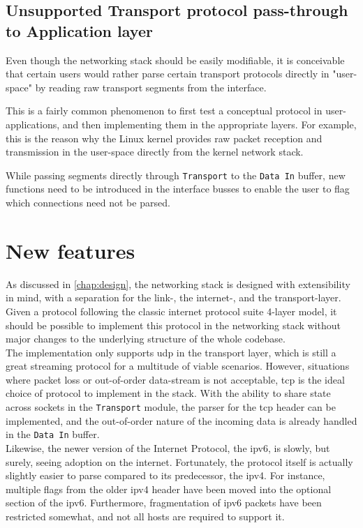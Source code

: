 \subsection{Unsupported Transport protocol pass-through to Application layer}
Even though the networking stack should be easily modifiable, it is conceivable
that certain users would rather parse certain transport protocols directly in
"user-space" by reading raw transport segments from the interface.

This is a fairly common phenomenon to first test a conceptual protocol in
user-applications, and then implementing them in the appropriate layers. For
example, this is the reason why the Linux kernel provides raw packet reception
and transmission in the user-space directly from the kernel network
stack\cite[Version~Linux 5.3-rc6, \texttt{Documentation/networking/tuntap.txt}]{linux}.

While passing segments directly through \texttt{Transport} to the \texttt{Data
In} buffer, new functions need to be introduced in the interface busses to
enable the user to flag which connections need not be parsed.



\section{New features}
As discussed in \autoref{chap:design}, the networking stack is designed
with extensibility in mind, with a separation for the link-, the internet-, and
the transport-layer. Given a protocol following the classic internet protocol
suite 4-layer model, it should be possible to implement this protocol in the
networking stack without major changes to the underlying structure of the whole
codebase.\\
The implementation only supports \gls{udp} in the transport layer, which is
still a great streaming protocol for a multitude of viable scenarios. However,
situations where packet loss or out-of-order data-stream is not acceptable,
\gls{tcp} is the ideal choice of protocol to implement in the stack. With the
ability to share state across sockets in the \texttt{Transport} module, the
parser for the \gls{tcp} header can be implemented, and the out-of-order nature
of the incoming data is already handled in the \texttt{Data In} buffer.\\
Likewise, the newer version of the Internet Protocol, the \gls{ipv6}, is slowly, but
surely, seeing adoption on the internet. Fortunately, the protocol itself is
actually slightly easier to parse compared to its predecessor, the \gls{ipv4}.
For instance, multiple flags from the older \gls{ipv4} header have been moved
into the optional section of the \gls{ipv6}. Furthermore, fragmentation of
\gls{ipv6} packets have been restricted somewhat, and not all hosts are required
to support it\cite{ipv6_proposed}.



